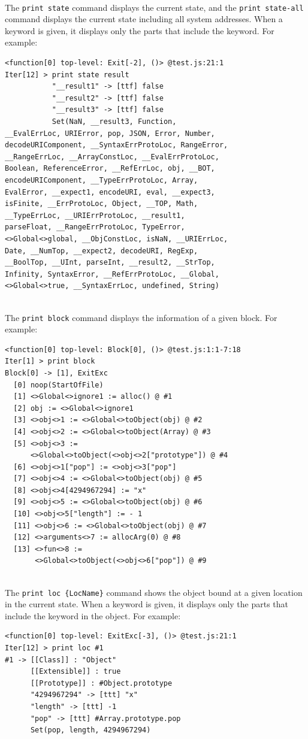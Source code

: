 \medskip\noindent
{}\\[.2em]
The \verb!print state! command displays the current state,
and the \verb!print state-all! command
displays the current state including all system addresses.
When a keyword is given, it displays only the parts that include the keyword.
For example:
{\small
\begin{verbatim}
<function[0] top-level: Exit[-2], ()> @test.js:21:1
Iter[12] > print state result
           "__result1" -> [ttf] false
           "__result2" -> [ttf] false
           "__result3" -> [ttf] false
           Set(NaN, __result3, Function,
__EvalErrLoc, URIError, pop, JSON, Error, Number,
decodeURIComponent, __SyntaxErrProtoLoc, RangeError,
__RangeErrLoc, __ArrayConstLoc, __EvalErrProtoLoc,
Boolean, ReferenceError, __RefErrLoc, obj, __BOT,
encodeURIComponent, __TypeErrProtoLoc, Array,
EvalError, __expect1, encodeURI, eval, __expect3,
isFinite, __ErrProtoLoc, Object, __TOP, Math,
__TypeErrLoc, __URIErrProtoLoc, __result1,
parseFloat, __RangeErrProtoLoc, TypeError,
<>Global<>global, __ObjConstLoc, isNaN, __URIErrLoc,
Date, __NumTop, __expect2, decodeURI, RegExp,
__BoolTop, __UInt, parseInt, __result2, __StrTop,
Infinity, SyntaxError, __RefErrProtoLoc, __Global,
<>Global<>true, __SyntaxErrLoc, undefined, String)
\end{verbatim}
}

\medskip\noindent
{}\\[.2em]
The \verb!print block! command displays the information of
a given block.  For example:
{\small
\begin{verbatim}
<function[0] top-level: Block[0], ()> @test.js:1:1-7:18
Iter[1] > print block
Block[0] -> [1], ExitExc
  [0] noop(StartOfFile)
  [1] <>Global<>ignore1 := alloc() @ #1
  [2] obj := <>Global<>ignore1
  [3] <>obj<>1 := <>Global<>toObject(obj) @ #2
  [4] <>obj<>2 := <>Global<>toObject(Array) @ #3
  [5] <>obj<>3 :=
      <>Global<>toObject(<>obj<>2["prototype"]) @ #4
  [6] <>obj<>1["pop"] := <>obj<>3["pop"]
  [7] <>obj<>4 := <>Global<>toObject(obj) @ #5
  [8] <>obj<>4[4294967294] := "x"
  [9] <>obj<>5 := <>Global<>toObject(obj) @ #6
  [10] <>obj<>5["length"] := - 1
  [11] <>obj<>6 := <>Global<>toObject(obj) @ #7
  [12] <>arguments<>7 := allocArg(0) @ #8
  [13] <>fun<>8 :=
       <>Global<>toObject(<>obj<>6["pop"]) @ #9
\end{verbatim}
}

\medskip\noindent
{}\\[.2em]
The \verb!print loc {LocName}! command shows the object
bound at a given location in the current state.
When a keyword is given, it displays only the parts that include the keyword
in the object.  For example:
{\small
\begin{verbatim}
<function[0] top-level: ExitExc[-3], ()> @test.js:21:1
Iter[12] > print loc #1
#1 -> [[Class]] : "Object"
      [[Extensible]] : true
      [[Prototype]] : #Object.prototype
      "4294967294" -> [ttt] "x"
      "length" -> [ttt] -1
      "pop" -> [ttt] #Array.prototype.pop
      Set(pop, length, 4294967294)
\end{verbatim}
}

